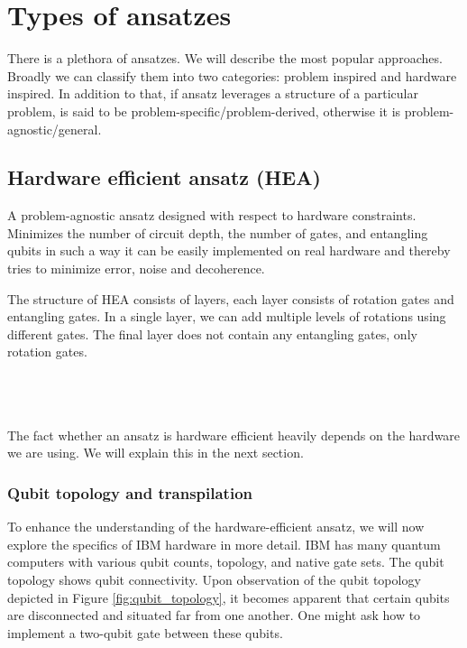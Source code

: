 \section{Types of ansatzes}
There is a plethora of ansatzes. We will describe the most popular approaches. Broadly we can classify them into two categories: problem inspired and hardware inspired. In addition to that, if ansatz leverages a structure of a particular problem, is said to be problem-specific/problem-derived, otherwise it is problem-agnostic/general. 

\subsection{Hardware efficient ansatz (HEA)}
A problem-agnostic ansatz designed with respect to hardware constraints. Minimizes the number of circuit depth, the number of gates, and entangling qubits in such a way it can be easily implemented on real hardware and thereby tries to minimize error, noise and decoherence.

The structure of HEA consists of layers, each layer consists of rotation gates and entangling gates. In a single layer, we can add multiple levels of rotations using different gates. The final layer does not contain any entangling gates, only rotation gates.

\\
\\
\\

The fact whether an ansatz is hardware efficient heavily depends on the hardware we are using. We will explain this in the next section.

\subsubsection{Qubit topology and transpilation}
To enhance the understanding of the hardware-efficient ansatz, we will now explore the specifics of IBM hardware in more detail. IBM has many quantum computers with various qubit counts, topology, and native gate sets. The qubit topology shows qubit connectivity. Upon observation of the qubit topology depicted in Figure \ref{fig:qubit_topology}, it becomes apparent that certain qubits are disconnected and situated far from one another. One might ask how to implement a two-qubit gate between these qubits.

